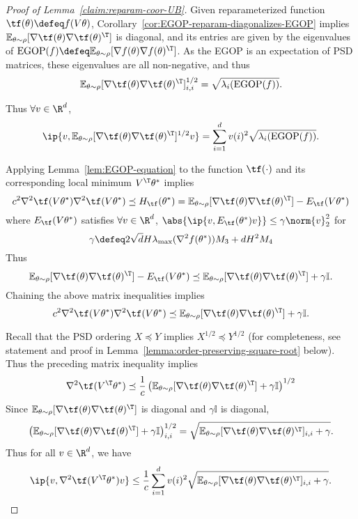 \begin{proof}[Proof of Lemma~\ref{claim:reparam-coor-UB}]
    Given reparameterized function $\tf(\theta)\defeq f(V\theta)$, Corollary~\ref{cor:EGOP-reparam-diagonalizes-EGOP} implies $\mathbb{E}_{\theta\sim \rho}[\nabla \tf(\theta)\nabla \tf(\theta)^\T]$ is diagonal, and its entries are given by the eigenvalues of $\operatorname{EGOP}(f)\defeq \mathbb{E}_{\theta\sim \rho}[\nabla f(\theta)\nabla f(\theta)^\T]$. As the EGOP is an expectation of PSD matrices, these eigenvalues are all non-negative, and thus
    \[
        \mathbb{E}_{\theta\sim \rho}[\nabla \tf(\theta)\nabla \tf(\theta)^\T]^{1/2}_{i,i} = \sqrt{\lambda_i(\operatorname{EGOP}(f))}.
    \]
    
    
    Thus $\forall v\in \R^d$,
    \[
        \ip{v, \mathbb{E}_{\theta\sim \rho}[\nabla \tf(\theta)\nabla \tf(\theta)^\T]^{1/2} v} = \sum_{i=1}^d v(i)^2 \sqrt{\lambda_i(\operatorname{EGOP}(f))}.
    \]

    Applying Lemma~\ref{lem:EGOP-equation} to the function $\tf(\cdot)$ and its corresponding local minimum $V^\T\theta^*$ implies
    \[
        c^2 \nabla^2 \tf(V\theta^*)\nabla^2\tf (V\theta^*) \preceq H_{\tf}(\theta^*) = \mathbb{E}_{\theta\sim\rho}[\nabla\tf(\theta)\nabla\tf(\theta)^\T] - E_{\tf}(V\theta^*)
    \]
    where $E_{\tf}(V\theta^*)$ satisfies $\forall v\in \R^d$, $\abs{\ip{v, E_{\tf}(\theta^*)v}} \leq \gamma \norm{v}^2_2$ for
    \[
        \gamma \defeq  2\sqrt{d}H \lambda_{\max}(\nabla^2 f(\theta^*)) M_3 + dH^2 M_4
    \]
    Thus
    \[
        \mathbb{E}_{\theta\sim\rho}[\nabla\tf(\theta)\nabla\tf(\theta)^\T] - E_{\tf}(V\theta^*) \preceq \mathbb{E}_{\theta\sim\rho}[\nabla\tf(\theta)\nabla\tf(\theta)^\T] +\gamma\mathbb{I}.
    \]
    Chaining the above matrix inequalities implies
    \[
        c^2\nabla^2 \tf(V\theta^*)\nabla^2\tf (V\theta^*)  \preceq \mathbb{E}_{\theta\sim\rho}[\nabla\tf(\theta)\nabla\tf(\theta)^\T] +\gamma\mathbb{I}.
    \]

    Recall that the PSD ordering $X\preceq Y$ implies $X^{1/2} \preceq Y^{1/2}$ (for completeness, see statement and proof in Lemma~\ref{lemma:order-preserving-square-root} below). Thus the preceding matrix inequality implies
    \[
        \nabla^2 \tf(V^\T\theta^*) \preceq \frac{1}{c}\left(\mathbb{E}_{\theta\sim\rho}[\nabla\tf(\theta)\nabla\tf(\theta)^\T] +\gamma\mathbb{I}\right)^{1/2}
    \]
    Since $\mathbb{E}_{\theta\sim\rho}[\nabla\tf(\theta)\nabla\tf(\theta)^\T]$ is diagonal and $\gamma\mathbb{I}$ is diagonal, 
    \[
        \left(\mathbb{E}_{\theta\sim\rho}[\nabla\tf(\theta)\nabla\tf(\theta)^\T] +\gamma\mathbb{I}\right)^{1/2}_{i,i} = \sqrt{\mathbb{E}_{\theta\sim\rho}[\nabla\tf(\theta)\nabla\tf(\theta)^\T]_{i,i} + \gamma}.
    \]
    Thus for all $v\in \R^d$, we have
    \begin{equation}\label{eq:UB-intermediate-quadratic}
        \ip{v, \nabla^2 \tf(V^\T \theta^*) v} \leq \frac{1}{c}\sum_{i=1}^d v(i)^2 \sqrt{\mathbb{E}_{\theta\sim\rho}[\nabla\tf(\theta)\nabla\tf(\theta)^\T]_{i,i} + \gamma}.
    \end{equation}
    

\end{proof}
